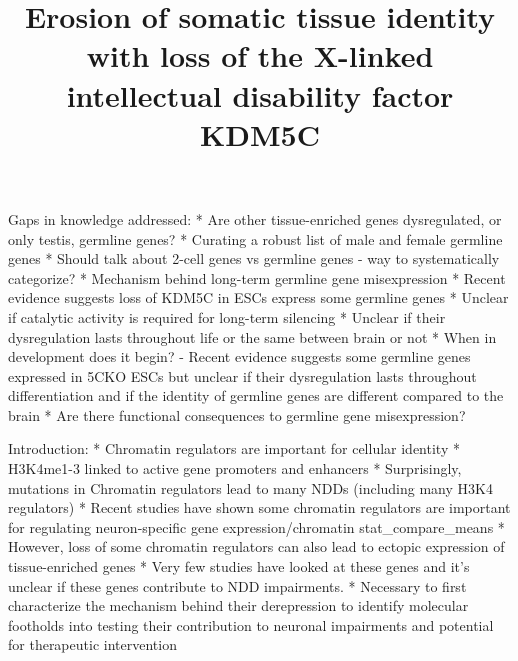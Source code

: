 \documentclass[
]{article}
\title{Erosion of somatic tissue identity with loss of the X-linked
intellectual disability factor KDM5C}
\author{}
\date{\vspace{-2.5em}}
\begin{document}
\maketitle

Gaps in knowledge addressed: * Are other tissue-enriched genes
dysregulated, or only testis, germline genes? * Curating a robust list
of male and female germline genes * Should talk about 2-cell genes vs
germline genes - way to systematically categorize? * Mechanism behind
long-term germline gene misexpression * Recent evidence suggests loss of
KDM5C in ESCs express some germline genes * Unclear if catalytic
activity is required for long-term silencing * Unclear if their
dysregulation lasts throughout life or the same between brain or not *
When in development does it begin? - Recent evidence suggests some
germline genes expressed in 5CKO ESCs but unclear if their dysregulation
lasts throughout differentiation and if the identity of germline genes
are different compared to the brain * Are there functional consequences
to germline gene misexpression?

Introduction: * Chromatin regulators are important for cellular identity
* H3K4me1-3 linked to active gene promoters and enhancers *
Surprisingly, mutations in Chromatin regulators lead to many NDDs
(including many H3K4 regulators) * Recent studies have shown some
chromatin regulators are important for regulating neuron-specific gene
expression/chromatin stat\_compare\_means * However, loss of some
chromatin regulators can also lead to ectopic expression of
tissue-enriched genes * Very few studies have looked at these genes and
it's unclear if these genes contribute to NDD impairments. * Necessary
to first characterize the mechanism behind their derepression to
identify molecular footholds into testing their contribution to neuronal
impairments and potential for therapeutic intervention
\end{document}
